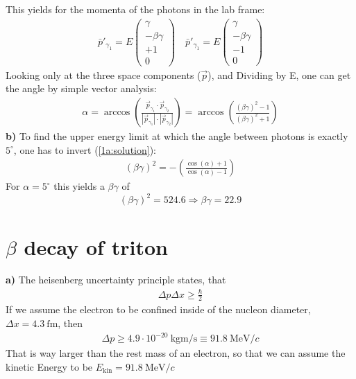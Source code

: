 \documentclass{article}
\begin{document}
This yields for the momenta of the photons in the lab frame:
\begin{align}
    \bar p' _{\gamma_1} = E \left( \begin{matrix} \gamma \\ - \beta \gamma
	    \\ +1 \\ 0
	\end{matrix} \right) \quad
    \bar p' _{\gamma_1} = E \left( \begin{matrix} \gamma \\ - \beta \gamma
	    \\ -1 \\ 0
	\end{matrix} \right)
\end{align}
Looking only at the three space components (\( \vec p \)), and
Dividing by E, one can get the angle by simple vector analysis:
\begin{align}
    \label{1a:solution}
    \alpha = \arccos \left( \frac{\vec p _{\gamma _{1}} \cdot
	    \vec p _{\gamma _{2}}}{|\vec p _{\gamma_1} | \cdot |
	    \vec p _{\gamma _{2}} |} \right) = \arccos
    \left( \frac{(\beta \gamma )^2 -1}{(\beta \gamma )^2 +1} \right)
\end{align}
\textbf{b)} To find the upper energy limit at which the angle between photons is
exactly \( 5^\circ \), one has to invert (\ref{1a:solution}):
\begin{align}
    (\beta \gamma)^2 = - \left( \frac{\cos(\alpha) + 1}{
	    \cos (\alpha) -1} \right)
\end{align}
For \( \alpha = 5 ^{\circ} \) this yields a \( \beta \gamma \) of 
\[ (\beta \gamma)^2 = 524.6 \Rightarrow \beta \gamma = 22.9 \]

\section{\texorpdfstring{\( \beta \) decay of triton}{}}
\textbf{a)} The heisenberg uncertainty principle states, that
\begin{align}
\Delta p \Delta x \geq \frac{\hbar}{2}
\end{align}
If we assume the electron to be confined inside of the nucleon diameter,
\( \Delta x = 4.3 \ \si{\femto\meter} \), then
\begin{align}
    \Delta p \geq 4.9 \cdot 10 ^{-20} \ \si{\kilogram\meter\per\second}
    \equiv 91.8 \ \si{\mega\electronvolt\per c}
\end{align}
That is way larger than the rest mass of an electron, so that we can assume
the kinetic Energy to be \( E _{\text{kin}} = 91.8 \
    \si{\mega\electronvolt\per c} \) \\
\end{document}
